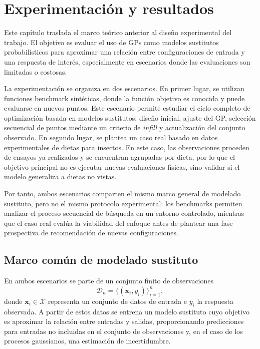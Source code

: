 \chapter{Experimentación y resultados}\label{chap:diseno_experimental}

Este capítulo traslada el marco teórico anterior al diseño experimental del trabajo. El objetivo es evaluar el uso de GPs como modelos sustitutos probabilísticos para aproximar una relación entre configuraciones de entrada y una respuesta de interés, especialmente en escenarios donde las evaluaciones son limitadas o costosas.

La experimentación se organiza en dos escenarios. En primer lugar, se utilizan funciones benchmark sintéticas, donde la función objetivo es conocida y puede evaluarse en nuevos puntos. Este escenario permite estudiar el ciclo completo de optimización basada en modelos sustitutos: diseño inicial, ajuste del GP, selección secuencial de puntos mediante un criterio de \emph{infill} y actualización del conjunto observado. En segundo lugar, se plantea un caso real basado en datos experimentales de dietas para insectos. En este caso, las observaciones proceden de ensayos ya realizados y se encuentran agrupadas por dieta, por lo que el objetivo principal no es ejecutar nuevas evaluaciones físicas, sino validar si el modelo generaliza a dietas no vistas.

Por tanto, ambos escenarios comparten el mismo marco general de modelado sustituto, pero no el mismo protocolo experimental: los benchmarks permiten analizar el proceso secuencial de búsqueda en un entorno controlado, mientras que el caso real evalúa la viabilidad del enfoque antes de plantear una fase prospectiva de recomendación de nuevas configuraciones.

\section{Marco común de modelado sustituto}\label{subsec:marco_comun_modelado_sustituto}

En ambos escenarios se parte de un conjunto finito de observaciones \[\mathcal{D}_n = \{(\bm{x}_i, y_i)\}_{i=1}^{n},\] donde \(\bm{x}_i \in \mathcal{X}\) representa un conjunto de datos de entrada e \(y_i\) la respuesta observada. A partir de estos datos se entrena un modelo sustituto cuyo objetivo es aproximar la relación entre entradas y salidas, proporcionando predicciones para entradas no incluidas en el conjunto de observaciones y, en el caso de los procesos gaussianos, una estimación de incertidumbre.

